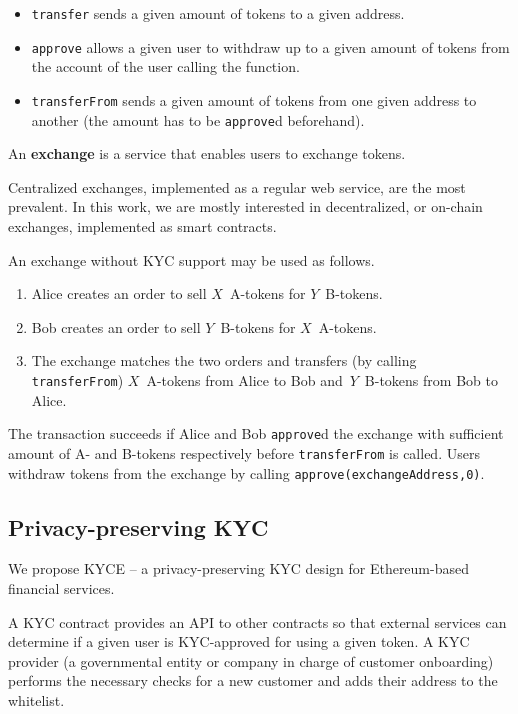 \begin{itemize}
	\item \texttt{transfer} sends a given amount of tokens to a given address.
	\item \texttt{approve} allows a given user to withdraw up to a given amount of tokens from the account of the user calling the function.
	\item \texttt{transferFrom} sends a given amount of tokens from one given address to another (the amount has to be \texttt{approve}d beforehand).
\end{itemize}

\begin{definition}
	An \textbf{exchange} is a service that enables users to exchange tokens.
\end{definition}

Centralized exchanges, implemented as a regular web service, are the most prevalent.
In this work, we are mostly interested in decentralized, or on-chain exchanges, implemented as smart contracts. 

An exchange without KYC support may be used as follows.
\begin{enumerate}
	\item Alice creates an order to sell $X$~A-tokens for $Y$~B-tokens.
	\item Bob creates an order to sell $Y$~B-tokens for $X$~A-tokens.
	\item The exchange matches the two orders and transfers (by calling \texttt{transferFrom}) $X$~A-tokens from Alice to Bob and~$Y$~B-tokens from Bob to Alice.
\end{enumerate}

The transaction succeeds if Alice and Bob \texttt{approve}d the exchange with sufficient amount of A- and B-tokens respectively before \texttt{transferFrom} is called.
Users withdraw tokens from the exchange by calling \texttt{approve(exchangeAddress,0)}.



\subsection{Privacy-preserving KYC}
\label{sec:PrivacyPreservingKYC}

We propose KYCE -- a privacy-preserving KYC design for Ethereum-based financial services.

A KYC contract provides an API to other contracts so that external services can determine if a given user is KYC-approved for using a given token.
A KYC provider (a governmental entity or company in charge of customer onboarding) performs the necessary checks for a new customer and adds their address to the whitelist.


